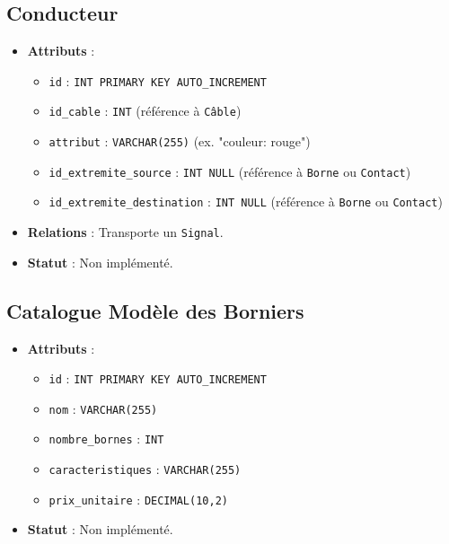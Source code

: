 \documentclass[a4paper,12pt]{article}
\begin{document}
\subsection{Conducteur}
\begin{itemize}
    \item \textbf{Attributs} :
    \begin{itemize}
        \item \texttt{id} : \texttt{INT PRIMARY KEY AUTO\_INCREMENT}
        \item \texttt{id\_cable} : \texttt{INT} (référence à \texttt{Câble})
        \item \texttt{attribut} : \texttt{VARCHAR(255)} (ex. "couleur: rouge")
        \item \texttt{id\_extremite\_source} : \texttt{INT NULL} (référence à \texttt{Borne} ou \texttt{Contact})
        \item \texttt{id\_extremite\_destination} : \texttt{INT NULL} (référence à \texttt{Borne} ou \texttt{Contact})
    \end{itemize}
    \item \textbf{Relations} : Transporte un \texttt{Signal}.
    \item \textbf{Statut} : Non implémenté.
\end{itemize}

\subsection{Catalogue Modèle des Borniers}
\begin{itemize}
    \item \textbf{Attributs} :
    \begin{itemize}
        \item \texttt{id} : \texttt{INT PRIMARY KEY AUTO\_INCREMENT}
        \item \texttt{nom} : \texttt{VARCHAR(255)}
        \item \texttt{nombre\_bornes} : \texttt{INT}
        \item \texttt{caracteristiques} : \texttt{VARCHAR(255)}
        \item \texttt{prix\_unitaire} : \texttt{DECIMAL(10,2)}
    \end{itemize}
    \item \textbf{Statut} : Non implémenté.
\end{itemize}
\end{document}
